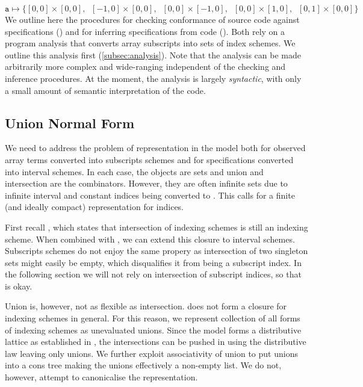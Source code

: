 \begin{equation*}
\texttt{a} \mapsto \{[0,0]\times[0,0], \;\; [-1,0]\times[0,0], \;\;
[0,0]\times[-1,0], \;\; [0,0]\times[1,0], \;\; [0,1]\times[0,0]\}
\end{equation*}
%
We outline here the procedures for checking conformance
of source code against specifications ()
and for inferring specifications from code ().
Both rely on a program analysis that converts array subscripts
 into sets of index schemes. We outline this analysis
first (\cref{subsec:analysis}). Note that the analysis
can be made arbitrarily more complex and wide-ranging independent
of the checking and inference procedures. At the moment, the analysis
is largely \emph{syntactic}, with only a small amount of
semantic interpretation of the code.

\subsection{Union Normal Form}\label{subsec:union-normal-form}

We need to address the problem of representation in the model both for observed
array terms converted into subscripts schemes and for specifications converted
into interval schemes. In each case, the objects are sets and union and
intersection are the combinators. However, they are often infinite sets due to
infinite interval and constant indices being converted to \bz{}. This calls for
a finite (and ideally compact) representation for indices.

First recall , which states that intersection of
indexing schemes is still an indexing scheme. When combined with
, we can extend this closure to interval schemes.
Subscripts schemes do not enjoy the same propery as intersection of two
singleton sets might easily be empty, which disqualifies it from being a
subscript index. In the following section we will not rely on intersection of
subscript indices, so that is okay.

Union is, however, not as flexible as intersection.  does
not form a closure for indexing schemes in general. For this reason, we
represent collection of all forms of indexing schemes as unevaluated unions.
Since the model forms a distributive lattice as established in
, the intersections can be pushed in using the
distributive law leaving only unions. We further exploit associativity of union
to put unions into a cons tree making the unions effectively a non-empty list.
We do not, however, attempt to canonicalise the representation.


